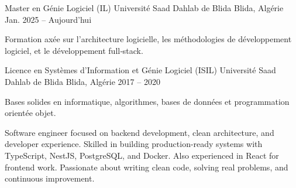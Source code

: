 \documentclass[11pt, a4paper]{awesome-cv}
\begin{document}
\begin{cventries}

  \cventry
    {Master en Génie Logiciel (IL)}
    {Université Saad Dahlab de Blida}
    {Blida, Algérie}
    {Jan. 2025 -- Aujourd'hui}
    {
      \begin{cvitems}
        \item {Formation axée sur l'architecture logicielle, les méthodologies de développement logiciel, et le développement full‑stack.}
      \end{cvitems}
    }

  \cventry
    {Licence en Systèmes d’Information et Génie Logiciel (ISIL)}
    {Université Saad Dahlab de Blida}
    {Blida, Algérie}
    {2017 -- 2020}
    {
      \begin{cvitems}
        \item {Bases solides en informatique, algorithmes, bases de données et programmation orientée objet.}
      \end{cvitems}
    }

\end{cventries}

\newpage


\begin{cvparagraph}
Software engineer focused on backend development, clean architecture, and developer experience. Skilled in building production-ready systems with TypeScript, NestJS, PostgreSQL, and Docker. Also experienced in React for frontend work. Passionate about writing clean code, solving real problems, and continuous improvement.
\end{cvparagraph}
\end{document}
